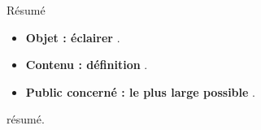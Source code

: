 \begin{center}
\Large
Résumé
\normalsize
\end{center}
\vspace{3cm}
\begin{itemize}[leftmargin=1cm, label=, itemsep=21pt]
\item {\bf Objet : éclairer} .
\item {\bf Contenu : définition} .
\item {\bf Public concerné : le plus large possible} .
\end{itemize}

\vspace{3cm}

résumé.

\vspace{3cm}

